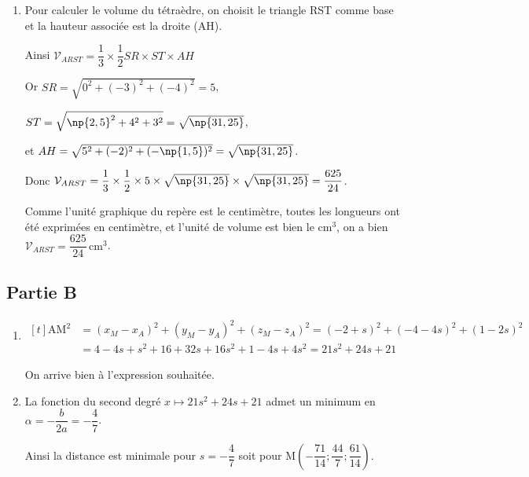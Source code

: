 \begin{enumerate}
\begin{enumerate}
			\item Pour calculer le volume du tétraèdre, on choisit le triangle RST comme base et la hauteur associée est la droite (AH).

			Ainsi \quad $\mathcal{V}_{ARST} = \dfrac{1}{3} \times \dfrac{1}{2} SR \times ST \times AH$

			Or \quad  $SR=\sqrt{0^2+(-3)^2+(-4)^2}=5$,

			$ST=\sqrt{\np{2,5}^2+4^2+3^2}=\sqrt{\np{31,25}}$,

			et \quad $AH=\sqrt{5^2+(-2)^2+(-\np{1,5})^2}=\sqrt{\np{31,25}}$.

			Donc \quad $\mathcal{V}_{ARST} = \dfrac{1}{3} \times \dfrac{1}{2} \times 5 \times \sqrt{\np{31,25}} \times \sqrt{\np{31,25}}=\dfrac{625}{24}$.

			Comme l'unité graphique du repère est le centimètre, toutes les longueurs ont été exprimées en centimètre, et l'unité de volume est bien le cm$^3$, on a bien $\mathcal{V}_{ARST} = \dfrac{625}{24} \,\text{cm}^3$.
		\end{enumerate}
	\end{enumerate}

	\subsection*{Partie B}

	\begin{enumerate}
		\item $\begin{aligned}[t]
			\mathrm{AM}^2&=\left(x_M-x_A \right)^2+\left(y_M-y_A \right)^2+\left(z_M-z_A \right)^2
		=( -2+s)^2+(-4-4s)^2+(1-2s)^2\\
		&=4-4s+s^2+16+32s+16s^2+1-4s+4s^2
		=21s^2+24s+21
		\end{aligned}$

		On arrive bien à l'expression souhaitée.

		\item La fonction du second degré \quad $x \longmapsto 21s^2+24s+21$ \quad admet un minimum en \quad $\alpha = -\dfrac{b}{2a}=-\dfrac{4}{7}$.

		Ainsi la distance est minimale pour \quad $s=-\dfrac{4}{7}$ \quad soit pour \quad  M$\left(-\dfrac{71}{14} ; \dfrac{44}{7} ; \dfrac{61}{14} \right)$.
	\end{enumerate}
